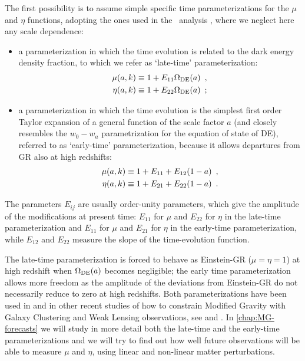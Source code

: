 The first possibility is to assume simple specific time parameterizations for
the $\mu$ and $\eta$ functions, adopting the ones used in the
\planck\ analysis \cite{planck_collaboration_planck_2016}, where we neglect here any scale dependence:
\begin{itemize}
	\item a parameterization in which the time evolution is related to the dark
	energy density fraction, to which we refer as `late-time' parameterization:
	\begin{eqnarray}
	\mu(a,k)\equiv1+E_{{\rm 11}}\Omega_{{\rm
			DE}}(a)\,\,\,,\label{eq:DE-mu-parametrization}\\
	\eta(a,k)\equiv1+E_{{\rm 22}}\Omega_{{\rm
			DE}}(a)\,\,\,;\label{eq:DE-eta-parametrization}
	\end{eqnarray}
	
	\item a parameterization in which the time evolution is the simplest first
	order Taylor expansion of a general function of the scale factor $a$
	(and closely resembles the $w_{0}-w_{a}$ parametrization for the
	equation of state of DE), referred to as `early-time' parameterization, because it
	allows departures from GR also at high redshifts:
	\begin{eqnarray}
	\mu(a,k)\equiv1+E_{{\rm 11}}+E_{{\rm
			12}}(1-a)\,\,\,,\label{eq:TR-mu-parametrization}\\
	\eta(a,k)\equiv1+E_{{\rm 21}}+E_{{\rm
			22}}(1-a)\,\,\,.\label{eq:TR-eta-parametrization}
	\end{eqnarray}
	
\end{itemize}
The parameters $E_{i j}$ are usually order-unity parameters, which give the amplitude of the modifications
at present time: $E_{11}$ for $\mu$ and $E_{22}$ for $\eta$ in the late-time parameterization and 
$E_{11}$ for $\mu$ and $E_{21}$ for $\eta$ in the early-time parameterization, while
$E_{12}$ and $E_{22}$ measure the slope of the time-evolution function.


The late-time parameterization is forced to behave as Einstein-GR ($\mu=\eta=1$)
at high redshift when $\Omega_{{\rm DE}}(a)$ becomes negligible;
the early time parameterization allows more freedom as the amplitude of the deviations
from Einstein-GR do not necessarily reduce to zero at high redshifts. 
Both parameterizations have been used in \cite{planck_collaboration_planck_2016}
and in other recent studies of how to constrain Modified Gravity with Galaxy Clustering and Weak Lensing observations, see
\cite{bull_extending_2015, Gleyzes2016} and \cite{Alonso2016}.
In \cref{chap:MG-forecasts} we will study in more detail both the late-time and the early-time parameterizations and we will
try to find out how well future observations will be able to measure $\mu$ and $\eta$, using linear and non-linear
matter perturbations.


